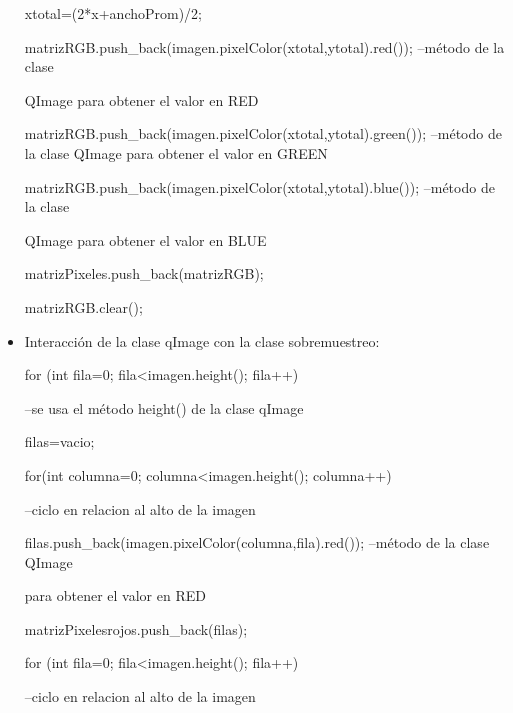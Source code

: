 \documentclass{article}
\begin{document}
\begin{itemize}
{{\hspace{1.5cm}xtotal=(2*x+anchoProm)/2;

\hspace{1.5cm}matrizRGB.push_back(imagen.pixelColor(xtotal,ytotal).red());
--método de la clase 

QImage para obtener el valor en RED

\hspace{1.5cm}matrizRGB.push_back(imagen.pixelColor(xtotal,ytotal).green()); --método de la clase QImage para obtener el valor en GREEN

\hspace{1.5cm}matrizRGB.push_back(imagen.pixelColor(xtotal,ytotal).blue());
--método de la clase 

QImage para obtener el valor en BLUE

\hspace{1.5cm}matrizPixeles.push_back(matrizRGB);

\hspace{1.5cm}matrizRGB.clear();

\hspace{1cm}}

\hspace{0.5cm}}


\item Interacción de la clase qImage con la clase sobremuestreo:

\hspace{0.5cm}for (int fila=0; fila<imagen.height(); fila++){ --se usa el método height() de la clase qImage

\hspace{1cm}filas=vacio;

\hspace{1cm}for(int columna=0; columna<imagen.height(); columna++){ --ciclo en relacion al alto de la imagen

\hspace{1.5cm}filas.push_back(imagen.pixelColor(columna,fila).red()); --método de la clase QImage 

para obtener el valor en RED

\hspace{1cm}}

\hspace{1cm}matrizPixelesrojos.push_back(filas);

\hspace{0.5cm}}

\hspace{0.5cm}for (int fila=0; fila<imagen.height(); fila++){ --ciclo en relacion al alto de la imagen

}
\end{itemize}
\end{document}
